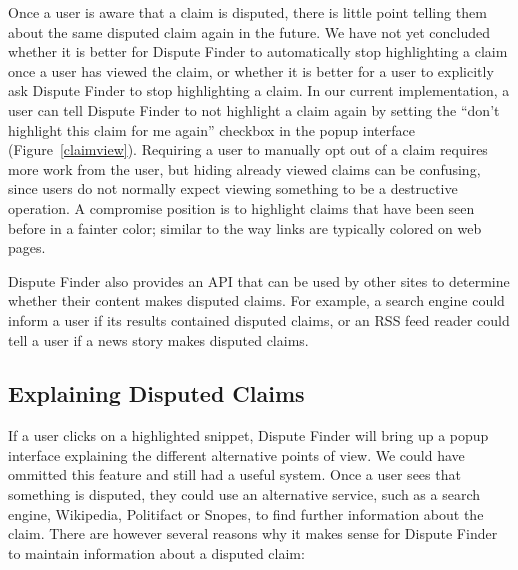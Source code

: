 \documentclass{www2010-submission}
\newcommand{\todo}[1]{}
\begin{document}
Once a user is aware that a claim is disputed, there is little point telling them about the same disputed claim again in the future. We have not yet concluded whether it is better for Dispute Finder to automatically stop highlighting a claim once a user has viewed the claim, or whether it is better for a user to explicitly ask Dispute Finder to stop highlighting a claim. In our current implementation, a user can tell Dispute Finder to not highlight a claim again by setting the ``don't highlight this claim for me again'' checkbox in the popup interface (Figure~\ref{claimview}). Requiring a user to manually opt out of a claim requires more work from the user, but hiding already viewed claims can be confusing, since users do not normally expect viewing something to be a destructive operation. A compromise position is to highlight claims that have been seen before in a fainter color; similar to the way links are typically colored on web pages.

\todo{Try using a fainter color}

\todo{Text is wrong in the screenshot}

Dispute Finder also provides an API that can be used by other sites to determine whether their content makes disputed claims. For example, a search engine could inform a user if its results contained disputed claims, or an RSS feed reader could tell a user if a news story makes disputed claims.

\todo{Document API online}
\todo{Change the highlight color to yellow? Auto-adjust highlight color based on background color?}
\todo{Should we automatically adjust the highlight color, based on the background color of the page}
\todo{Discuss previous work on highlighting here, rather than in related work?}


\subsection{Explaining Disputed Claims}

If a user clicks on a highlighted snippet, Dispute Finder will bring up a popup interface explaining the different alternative points of view. We could have ommitted this feature and still had a useful system. Once a user sees that something is disputed, they could use an alternative service, such as a search engine, Wikipedia, Politifact or Snopes, to find further information about the claim. There are however several reasons why it makes sense for Dispute Finder to maintain information about a disputed claim:
\end{document}

